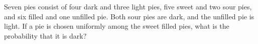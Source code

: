Seven pies consist of four dark and three light pies, five sweet and two sour pies, and six filled and one unfilled pie. Both sour pies are dark, and the unfilled pie is light. If a pie is chosen uniformly among the sweet filled pies, what is the probability that it is dark?

